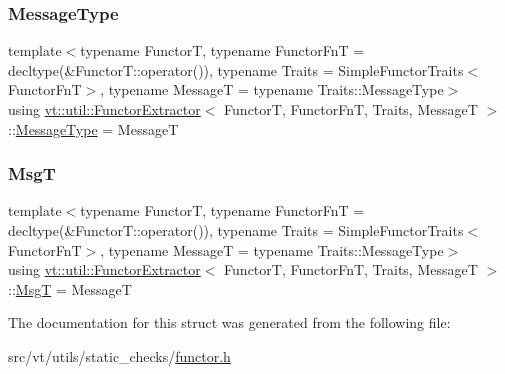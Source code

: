 \mbox{\label{structvt_1_1util_1_1_functor_extractor_a6da3f67871dbf871f832dd5efad726d4}} 
\subsubsection{\texorpdfstring{Message\+Type}{MessageType}}
{\footnotesize\ttfamily template$<$typename FunctorT, typename Functor\+FnT = decltype(\&\+Functor\+T\+::operator()), typename Traits = Simple\+Functor\+Traits$<$\+Functor\+Fn\+T$>$, typename MessageT = typename Traits\+::\+Message\+Type$>$ \\
using \hyperlink{structvt_1_1util_1_1_functor_extractor}{vt\+::util\+::\+Functor\+Extractor}$<$ FunctorT, Functor\+FnT, Traits, MessageT $>$\+::\hyperlink{structvt_1_1util_1_1_functor_extractor_a6da3f67871dbf871f832dd5efad726d4}{Message\+Type} =  MessageT}

\mbox{\label{structvt_1_1util_1_1_functor_extractor_a6806fe1c31dcbaaeb42221844a396caa}} 
\subsubsection{\texorpdfstring{MsgT}{MsgT}}
{\footnotesize\ttfamily template$<$typename FunctorT, typename Functor\+FnT = decltype(\&\+Functor\+T\+::operator()), typename Traits = Simple\+Functor\+Traits$<$\+Functor\+Fn\+T$>$, typename MessageT = typename Traits\+::\+Message\+Type$>$ \\
using \hyperlink{structvt_1_1util_1_1_functor_extractor}{vt\+::util\+::\+Functor\+Extractor}$<$ FunctorT, Functor\+FnT, Traits, MessageT $>$\+::\hyperlink{structvt_1_1util_1_1_functor_extractor_a6806fe1c31dcbaaeb42221844a396caa}{MsgT} =  MessageT}



The documentation for this struct was generated from the following file\+:\begin{DoxyCompactItemize}
\item 
src/vt/utils/static\+\_\+checks/\hyperlink{functor_8h}{functor.\+h}\end{DoxyCompactItemize}
